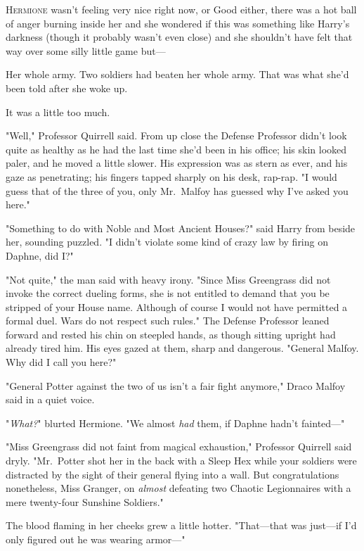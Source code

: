 
\lettrine{H}{ermione} wasn't 
feeling very nice right now, or Good either, there was a hot ball of anger 
burning inside her and she wondered if this was something like Harry's darkness 
(though it probably wasn't even close) and she shouldn't have felt that way 
over some silly little game but---

Her whole army. Two soldiers had beaten her whole army. That was what she'd 
been told after she woke up.

It was a little too much.

"Well," Professor Quirrell said. From up close the Defense Professor didn't 
look quite as healthy as he had the last time she'd been in his office; his 
skin looked paler, and he moved a little slower. His expression was as stern as 
ever, and his gaze as penetrating; his fingers tapped sharply on his desk, 
rap-rap. "I would guess that of the three of you, only Mr.~Malfoy has guessed 
why I've asked you here."

"Something to do with Noble and Most Ancient Houses?" said Harry from beside 
her, sounding puzzled. "I didn't violate some kind of crazy law by firing on 
Daphne, did I?"

"Not quite," the man said with heavy irony. "Since Miss Greengrass did not 
invoke the correct dueling forms, she is not entitled to demand that you be 
stripped of your House name. Although of course I would not have permitted a 
formal duel. Wars do not respect such rules." The Defense Professor leaned 
forward and rested his chin on steepled hands, as though sitting upright had 
already tired him. His eyes gazed at them, sharp and dangerous. "General 
Malfoy. Why did I call you here?"

"General Potter against the two of us isn't a fair fight anymore," Draco Malfoy 
said in a quiet voice.

"\emph{What?}" blurted Hermione. "We almost \emph{had} them, if Daphne hadn't 
fainted---"

"Miss Greengrass did not faint from magical exhaustion," Professor Quirrell 
said dryly. "Mr.~Potter shot her in the back with a Sleep Hex while your 
soldiers were distracted by the sight of their general flying into a wall. But 
congratulations nonetheless, Miss Granger, on \emph{almost} defeating two 
Chaotic Legionnaires with a mere twenty-four Sunshine Soldiers."

The blood flaming in her cheeks grew a little hotter. "That---that was 
just---if I'd only figured out he was wearing armor---"

